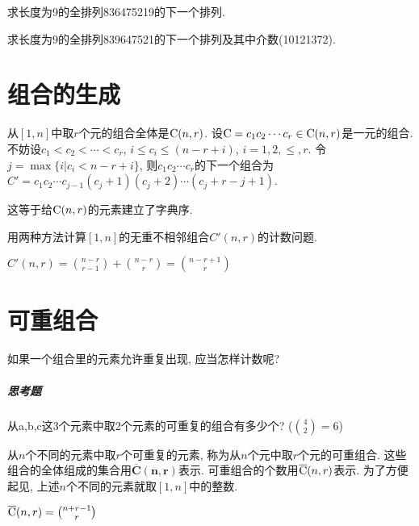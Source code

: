         \begin{example}
            求长度为9的全排列836475219的下一个排列.
        \end{example}

        \begin{example}
            求长度为9的全排列839647521的下一个排列及其中介数(10121372). 
        \end{example}
    
\section{组合的生成}

    \begin{algorithm}
        [求一个组合的下一个组合的算法]
        从$[1,n]$中取$r$个元的组合全体是$\mathrm{C}(n,r)$. 设$\mathrm{C}=c_1c_2\cdots c_r\in\mathrm{C}(n,r)$是一元的组合. 不妨设$c_1<c_2<\cdots<c_r$, $i\leqslant c_i\leqslant(n-r+i)$, $i=1,2,\leqslant,r$. 令$j=\max\{i|c_i<n-r+i\}$, 则$c_1c_2\cdots c_r$的下一个组合为$C'=c_1c_2\cdots c_{j-1}(c_j+1)(c_j+2)\cdots(c_j+r-j+1)$.
        \begin{note}
            这等于给$\mathrm{C}(n,r)$的元素建立了字典序.
        \end{note}
    \end{algorithm}

    \begin{example}
        用两种方法计算$[1,n]$的无重不相邻组合$C'(n,r)$的计数问题.

        $C'(n,r)={n-r\choose r-1}+{n-r\choose r}={n-r+1\choose r}$
    \end{example}

\section{可重组合}

    如果一个组合里的元素允许重复出现, 应当怎样计数呢?

    \subparagraph{思考题}
        从a,b,c这3个元素中取2个元素的可重复的组合有多少个? (${4\choose2}=6$)

    \begin{definition}
        [可重组合]
        从$n$个不同的元素中取$r$个可重复的元素, 称为从$n$个元中取$r$个元的\textsf{可重组合}. 这些组合的全体组成的集合用$\mathbf{\overline{C}(n,r)}$表示. 可重组合的个数用$\overline {\mathrm{C}}(n,r)$表示. 为了方便起见, 上述$n$个不同的元素就取$[1,n]$中的整数. 
    \end{definition}

    \begin{theorem}
        $\overline {\mathrm{C}}(n,r)={n+r-1\choose r}$
    \end{theorem}

